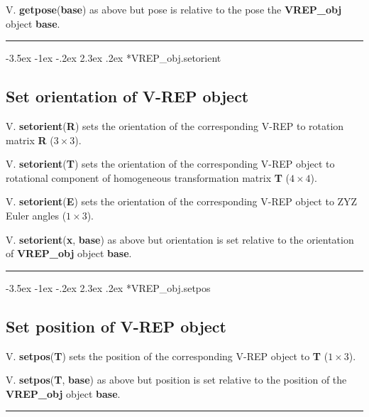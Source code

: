 \documentclass[a4paper]{article}
\makeatletter
\renewcommand\section{%
\@startsection{section}{1}{\z@}%
  {-3.5ex \@plus -1ex \@minus -.2ex}%
  {2.3ex \@plus.2ex}%
  {\color{red}\sffamily\huge\bfseries}}
\makeatother
\begin{document}
V.\textbf{\color{red} getpose}(\textbf{base}) as above but pose is relative to the
pose the \textbf{\color{red} VREP\_obj} object \textbf{base}.

\vspace{1.5ex}\hrule

\hypertarget{VREP\_obj.setorient}{\section*{VREP\_obj.setorient}}
\subsection*{Set orientation of V-REP object}
V.\textbf{\color{red} setorient}(\textbf{R}) sets the orientation of the corresponding V-REP to rotation matrix \textbf{R} ($3 \times 3$).

V.\textbf{\color{red} setorient}(\textbf{T}) sets the orientation of the corresponding V-REP object to rotational component of homogeneous transformation matrix
\textbf{T} ($4 \times 4$).

V.\textbf{\color{red} setorient}(\textbf{E}) sets the orientation of the corresponding V-REP object to ZYZ Euler angles ($1 \times 3$).

V.\textbf{\color{red} setorient}(\textbf{x}, \textbf{base}) as above but orientation is set relative to the
orientation of \textbf{\color{red} VREP\_obj} object \textbf{base}.

\vspace{1.5ex}\hrule

\hypertarget{VREP\_obj.setpos}{\section*{VREP\_obj.setpos}}
\subsection*{Set position of V-REP object}
V.\textbf{\color{red} setpos}(\textbf{T}) sets the position of the corresponding V-REP object
to \textbf{T} ($1 \times 3$).

V.\textbf{\color{red} setpos}(\textbf{T}, \textbf{base}) as above but position is set relative to the
position of the \textbf{\color{red} VREP\_obj} object \textbf{base}.

\vspace{1.5ex}\hrule
\end{document}

